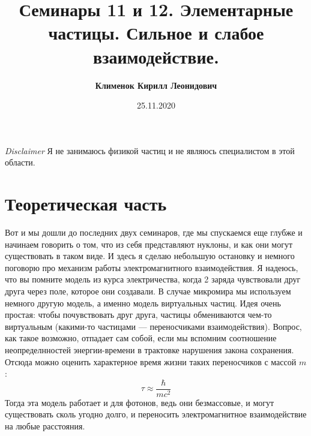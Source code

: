 \documentclass[12pt]{article}
\begin{document}
 
\title{\textbf{Семинары 11 и 12. Элементарные частицы. Сильное и слабое взаимодействие.}}
\author{\textbf{Клименок Кирилл Леонидович}}
\date{25.11.2020}
\maketitle
\textit{Disclaimer} Я не занимаюсь физикой частиц и не являюсь специалистом в этой области.
\section{Теоретическая часть}
Вот и мы дошли до последних двух семинаров, где мы спускаемся еще глубже и начинаем говорить о том, что из себя представляют нуклоны, и как они могут существовать в таком виде. И здесь я сделаю небольшую остановку и немного поговорю про механизм работы электромагнитного взаимодействия. Я надеюсь, что вы помните модель из курса электричества, когда 2 заряда чувствовали друг друга через поле, которое они создавали. В случае микромира мы используем немного другую модель, а именно модель виртуальных частиц. Идея очень простая: чтобы почувствовать друг друга, частицы обмениваются чем-то виртуальным (какими-то частицами --- переносчиками взаимодействия). Вопрос, как такое возможно, отпадает сам собой, если мы вспомним соотношение неопределнностей энергии-времени в трактовке нарушения закона сохранения. Отсюда можно оценить характерное время жизни таких переносчиков с массой $m$:
\begin{equation*}
    \tau \approx \dfrac{\hbar}{mc^2}
\end{equation*}
Тогда эта модель работает и для фотонов, ведь они безмассовые, и могут существовать сколь угодно долго, и переносить электромагнитное взаимодействие на любые расстояния.
\end{document}
